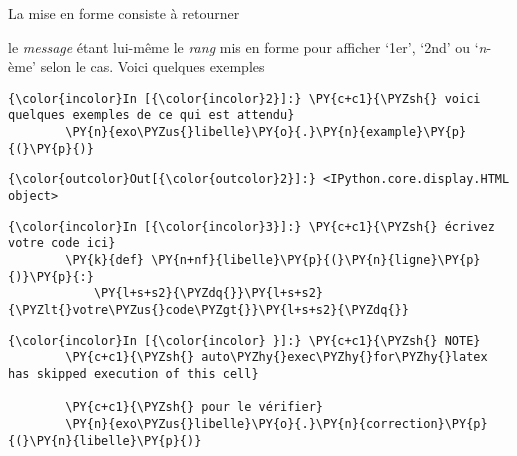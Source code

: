     La mise en forme consiste à retourner

\begin{Shaded}
\begin{Highlighting}[frame=lines,framerule=0.6mm,rulecolor=\color{asisframecolor}]
\end{Highlighting}
\end{Shaded}

le \emph{message} étant lui-même le \emph{rang} mis en forme pour
afficher `1er', `2nd' ou `\emph{n}-ème' selon le cas. Voici quelques
exemples

    \begin{Verbatim}[commandchars=\\\{\},frame=single,framerule=0.3mm,rulecolor=\color{cellframecolor}]
{\color{incolor}In [{\color{incolor}2}]:} \PY{c+c1}{\PYZsh{} voici quelques exemples de ce qui est attendu}
        \PY{n}{exo\PYZus{}libelle}\PY{o}{.}\PY{n}{example}\PY{p}{(}\PY{p}{)}
\end{Verbatim}


\begin{Verbatim}[commandchars=\\\{\},frame=single,framerule=0.3mm,rulecolor=\color{cellframecolor}]
{\color{outcolor}Out[{\color{outcolor}2}]:} <IPython.core.display.HTML object>
\end{Verbatim}
            
    \begin{Verbatim}[commandchars=\\\{\},frame=single,framerule=0.3mm,rulecolor=\color{cellframecolor}]
{\color{incolor}In [{\color{incolor}3}]:} \PY{c+c1}{\PYZsh{} écrivez votre code ici}
        \PY{k}{def} \PY{n+nf}{libelle}\PY{p}{(}\PY{n}{ligne}\PY{p}{)}\PY{p}{:}
            \PY{l+s+s2}{\PYZdq{}}\PY{l+s+s2}{\PYZlt{}votre\PYZus{}code\PYZgt{}}\PY{l+s+s2}{\PYZdq{}}
\end{Verbatim}


    \begin{Verbatim}[commandchars=\\\{\},frame=single,framerule=0.3mm,rulecolor=\color{cellframecolor}]
{\color{incolor}In [{\color{incolor} }]:} \PY{c+c1}{\PYZsh{} NOTE}
        \PY{c+c1}{\PYZsh{} auto\PYZhy{}exec\PYZhy{}for\PYZhy{}latex has skipped execution of this cell}
        
        \PY{c+c1}{\PYZsh{} pour le vérifier}
        \PY{n}{exo\PYZus{}libelle}\PY{o}{.}\PY{n}{correction}\PY{p}{(}\PY{n}{libelle}\PY{p}{)}
\end{Verbatim}



    
    
    
